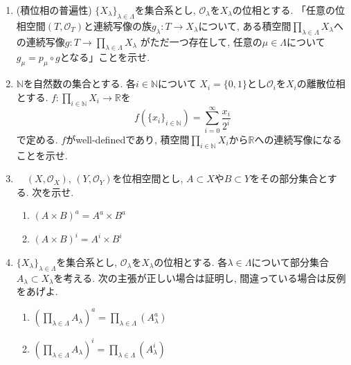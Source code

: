\documentclass[dvipdfmx,a4paper,11pt]{article}
\newcommand{\R}{\mathbb{R}}
\newcommand{\N}{\mathbb{N}}
\theoremstyle{definition}
\begin{document}
\begin{enumerate}[ label=\textbf{問}5.\arabic*]

\item (積位相の普遍性)
$\{ X_\lambda \}_{\lambda \in \Lambda}$を集合系とし, $\mathscr{O}_{\lambda}$を$X_{\lambda}$の位相とする. 
「任意の位相空間$(T, \mathscr{O}_{T})$と連続写像の族$g_{\lambda} : T \rightarrow X_\lambda $について, 
ある積空間$\prod_{\lambda \in \Lambda} X_{\lambda}$への連続写像$g : T \rightarrow \prod_{\lambda \in \Lambda} X_{\lambda}$
がただ一つ存在して, 任意の$\mu \in \Lambda$について$g_{\mu} = p_{\mu} \circ g $となる」ことを示せ. 

\item $\N$を自然数の集合とする. 各$i \in \N$について $X_{i} = \{ 0,1\}$とし$ \mathscr{O}_{i}$を$X_i$の離散位相とする.
$f :\prod_{i \in \N} X_{i} \rightarrow \R$を
$$
f (\{ x_i\}_{i \in \N}) = \sum_{i=0}^{\infty} \frac{x_i}{2^i}
$$
で定める. $f$がwell-definedであり, 積空間$\prod_{i \in \N} X_{i}$から$\R$への連続写像になることを示せ.


\item　$(X, \mathscr{O}_X )$, $(Y, \mathscr{O}_Y)$を位相空間とし, $A \subset X$や$B \subset Y$をその部分集合とする. 次を示せ.
	\begin{enumerate}
	\item $(A \times  B)^a = A^a \times B^a$
	\item $(A \times  B)^i = A^i \times B^i$
	\end{enumerate}


\item $\{ X_\lambda \}_{\lambda \in \Lambda}$を集合系とし, $\mathscr{O}_{\lambda}$を$X_{\lambda}$の位相とする. 各$\lambda \in \Lambda$について部分集合$A_{\lambda} \subset X_{\lambda}$を考える.  次の主張が正しい場合は証明し, 間違っている場合は反例をあげよ.
	\begin{enumerate}
	\item $(\prod_{\lambda \in \Lambda} A_{\lambda})^a =\prod_{\lambda \in \Lambda} (A_{\lambda}^a)$
	\item $(\prod_{\lambda \in \Lambda} A_{\lambda})^i =\prod_{\lambda \in \Lambda} (A_{\lambda}^i)$
	\end{enumerate}
	
 \end{enumerate}
\end{document}
